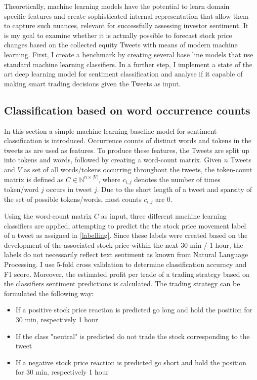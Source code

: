 \documentclass[a4paper,12pt]{article}%
\begin{document}
Theoretically, machine learning models have the potential to learn domain specific features and create sophisticated internal representation that allow them to capture such nuances, relevant for successfully assessing investor sentiment. It is my goal to examine whether it is actually possible to forecast stock price changes based on the collected equity Tweets with means of modern machine learning. First, I create a benchmark by creating several base line models that use standard machine learning classifiers. In a further step, I implement a state of the art deep learning model for sentiment classification and analyse if it capable of making smart trading decisions given the Tweets as input.

\subsection{Classification based on word occurrence counts}
In this section a simple machine learning baseline model for sentiment classification is introduced. Occurrence counts of distinct words and tokens in the tweets as are used as features. To produce these features, the Tweets are split up into tokens and words, followed by creating a word-count matrix. Given $n$ Tweets and $V$ as set of all words/tokens occurring throughout the tweets, the token-count matrix is defined as $C \in \mathbb{N}^{n \times |V|}$, where $c_{i,j}$ denotes the number of times token/word $j$ occurs in tweet $j$.  Due to the short length of a tweet and sparsity of the set of possible tokens/words, most counts $c_{i,j}$ are 0.

Using the word-count matrix $C$ as input, three different machine learning classifiers are applied, attempting to predict the the stock price movement label of a tweet as assigned in \ref{labelling}. Since these labels were created based on the development of the associated stock price within the next 30 min / 1 hour, the labels do not necessarily reflect text sentiment as known from Natural Language Processing. I use 5-fold cross validation to determine classification accuracy and F1 score. Moreover, the estimated profit per trade of a trading strategy based on the classifiers sentiment predictions is calculated. The trading strategy can be formulated the following way: 
\begin{itemize}
\item If a positive stock price reaction is predicted go long and hold the position  for 30 min, respectively 1 hour
\item If the class "neutral" is predicted do not trade the stock corresponding to the tweet
\item If a negative stock price reaction is predicted go short and hold the position for 30 min, respectively 1 hour
\end{itemize}
\end{document}
